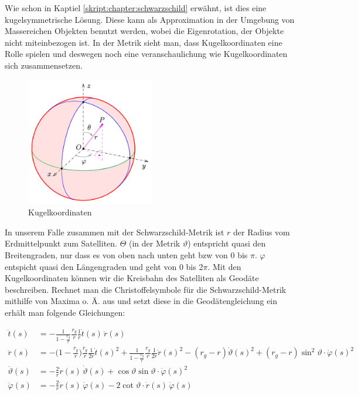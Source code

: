 \begin{refsection}
\noindent{}Wie schon in Kaptiel \ref{skript:chapter:schwarzschild} erwähnt, ist dies eine kugelsymmetrische Lösung. Diese kann als Approximation in der Umgebung von Massereichen Objekten benutzt werden, wobei die Eigenrotation, der Objekte nicht miteinbezogen ist. In der Metrik sieht man, dass Kugelkoordinaten eine Rolle spielen und deswegen noch eine veranschaulichung wie Kugelkoordinaten sich zusammensetzen.

\begin{figure}[h]
    \centering
    \includegraphics[width=0.5\textwidth]{gps/pictures/kugelkoordinaten.png}
    \caption{Kugelkoordinaten}
\end{figure}

In unserem Falle zusammen mit der Schwarzschild-Metrik ist \( r \) der Radius vom Erdmittelpunkt zum Satelliten. \( \Theta \) (in der Metrik \( \vartheta \)) entspricht quasi den Breitengraden, nur dass es von oben nach unten geht bzw von 0 bis \( \pi \). \( \varphi \) entspicht quasi den Längengraden und geht von 0 bis 2\( \pi \). Mit den Kugelkoordinaten können wir die Kreisbahn des Satelliten als Geodäte beschreiben. Rechnet man die Christoffelsymbole für die Schwarzschild-Metrik mithilfe von Maxima o. Ä. aus und setzt diese in die Geodätengleichung ein erhält man folgende Gleichungen:

\begin{align*}
\ddot t(s)
&=
-\frac{1}{1-\displaystyle\frac{r_g}{r}}\frac{r_g}{r}\frac{1}{r}\dot t(s)\,\dot r(s)
\\
\ddot r(s)
&=
-\biggl(1-\frac{r_g}{r}\biggr)\frac{r_g}{r}\frac1{2r}\dot t(s)^2
+\frac{1}{1-\displaystyle\frac{r_g}{r}} \frac{r_g}{r}\frac1{2r}\dot r(s)^2
-(r_g-r)\dot \vartheta(s)^2 + (r_g-r)\sin^2 \vartheta \cdot \dot \varphi(s)^2
\\
\ddot \vartheta(s)
&=
-\frac{2}{r} \dot r(s)\, \dot \vartheta(s)
+\cos\vartheta\sin\vartheta \cdot \dot\varphi(s)^2
\\
\ddot \varphi(s)
&=
-\frac{2}{r} \dot r(s)\,\dot \varphi(s)
-2\cot\vartheta \cdot \dot r(s)\,\dot\varphi(s)
\end{align*}


\end{refsection}
